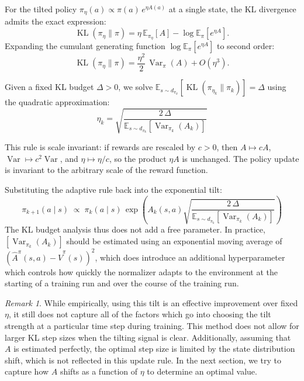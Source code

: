 \documentclass{article}
\theoremstyle{plain}
\theoremstyle{definition}
\theoremstyle{remark}
\newtheorem{remark}[theorem]{Remark}
\newcommand{\E}{\mathbb{E}}
\DeclareMathOperator{\KL}{KL}
\DeclareMathOperator{\Var}{Var}
\begin{document}
For the tilted policy $\pi_\eta(a) \propto \pi(a)\,e^{\eta A(a)}$ at a single state, the KL divergence admits the exact expression:
\[
  \KL(\pi_\eta \| \pi) = \eta\,\E_{\pi_\eta}[A] - \log \E_\pi[e^{\eta A}].
\]
Expanding the cumulant generating function $\log \E_\pi[e^{\eta A}]$ to second order:
\begin{equation}\label{eq:kl-expansion}
  \KL(\pi_\eta \| \pi) = \frac{\eta^2}{2}\,\Var_\pi(A) + O(\eta^3).
\end{equation}

Given a fixed KL budget $\Delta > 0$, we solve $\E_{s \sim d_{\pi_k}}[\KL(\pi_{\eta_k} \| \pi_k)] = \Delta$ using the quadratic approximation:
\begin{equation}\label{eq:eta-rule}
  \boxed{\;\eta_k = \sqrt{\frac{2\,\Delta}{\E_{s \sim d_{\pi_k}}[\Var_{\pi_k}(A_k)]}}\;}
\end{equation}

This rule is scale invariant: if rewards are rescaled by $c > 0$, then $A \mapsto cA$, $\Var \mapsto c^2\Var$, and $\eta \mapsto \eta/c$, so the product $\eta A$ is unchanged. The policy update is invariant to the arbitrary scale of the reward function.

Substituting the adaptive rule back into the exponential tilt:
\[
  \pi_{k+1}(a \mid s) \;\propto\; \pi_k(a \mid s)\,\exp\!\left(A_k(s,a)\sqrt{\frac{2\,\Delta}{\E_{s \sim d_{\pi_k}}[\Var_{\pi_k}(A_k)]}}\right)
\]
The KL budget analysis thus does not add a free parameter. In practice, $[\Var_{\pi_k}(A_k)]$ should be estimated using an exponential moving average of $(\hat{A}^\pi(s,a)-\hat{V}^\pi(s))^2$, which does introduce an additional hyperparameter which controls how quickly the normalizer adapts to the environment at the starting of a training run and over the course of the training run. 

\begin{remark}
While empirically, using this tilt is an effective improvement over fixed $\eta$, it still does not capture all of the factors which go into choosing the tilt strength at a particular time step during training. This method does not allow for larger KL step sizes when the tilting signal is clear. Additionally, assuming that $A$ is estimated perfectly, the optimal step size is limited by the state distribution shift, which is not reflected in this update rule. In the next section, we try to capture how $A$ shifts as a function of $\eta$ to determine an optimal value.
\end{remark}
\end{document}
